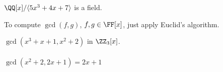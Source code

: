 \documentclass[class=scrartcl, crop=false]{standalone}
\begin{document}
\begin{example}
  $\QQ[x] / \langle 5x^3 + 4x + 7 \rangle $ is a field.

  To compute $\gcd(f, g)$, $f, g \in \FF[x]$, just apply Euclid's algorithm.

  \begin{example}
    $\gcd(x^3 + x + 1, x^2 + 2)$ in $\ZZ_3[x]$.
    \\\\
    $\gcd(x^2 + 2, 2x + 1) = 2x + 1$
  \end{example} 
\end{example} 
\end{document}
